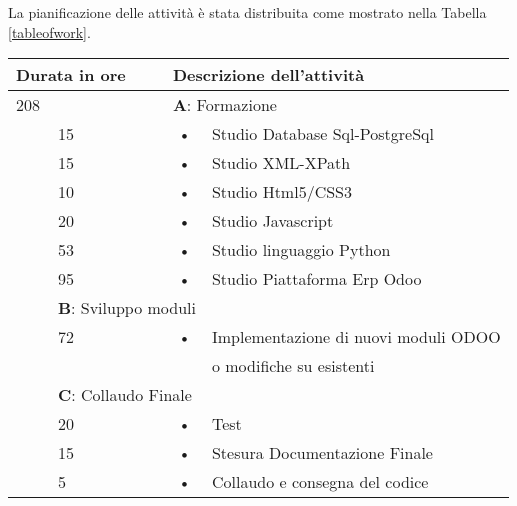 \newpage
La pianificazione delle attività è stata distribuita come mostrato nella Tabella \ref{tableofwork}.
\begin{center}
	\begin{tabular}{|l|l|c l|}
		\hline
		\multicolumn{2}{|l|}{\textbf{Durata in ore}}		&	\multicolumn{2}{l|}{\textbf{Descrizione dell'attività}}\\
		\hline
		\multicolumn{2}{|l|}{208}	&	\multicolumn{2}{l|}{\textbf{A}: Formazione}\\
		\hline
		\multirow{5}{1cm}{ } & 15  & \hspace{5mm}•\hspace{2mm} & Studio Database Sql-PostgreSql \\
		\multirow{5}{1cm}{ } & 15 & \hspace{5mm}•\hspace{2mm} & Studio XML-XPath                 \\
		\multirow{5}{1cm}{ } & 10 & \hspace{5mm}•\hspace{2mm} & Studio Html5/CSS3\\
		\multirow{5}{1cm}{ } & 20 & \hspace{5mm}•\hspace{2mm} & Studio Javascript\\
		\multirow{5}{1cm}{ } & 53 & \hspace{5mm}•\hspace{2mm} & Studio linguaggio Python\\
		\multirow{5}{1cm}{ } & 95 & \hspace{5mm}•\hspace{2mm} & Studio Piattaforma Erp Odoo\\
		\hline																											
		\multicolumn{2}{|l|}{72}	&	\multicolumn{2}{l|}{\textbf{B}: Sviluppo moduli}\\
		\hline
		\multirow{5}{1cm}{ } & 72  & \hspace{5mm}•\hspace{2mm} & Implementazione di nuovi moduli ODOO  \\ & & & o modifiche su esistenti\\
		
		\hline
																											
		\multicolumn{2}{|l|}{40}	&	\multicolumn{2}{l|}{\textbf{C}: Collaudo Finale}\\
		\hline
		\multirow{5}{1cm}{ } & 20  & \hspace{5mm}•\hspace{2mm} & Test\\
		\multirow{5}{1cm}{ } & 15 & \hspace{5mm}•\hspace{2mm} & Stesura Documentazione Finale \\
		\multirow{5}{1cm}{ } & 5 & \hspace{5mm}•\hspace{2mm} & Collaudo e consegna del codice\\


\end{tabular}
\end{center}
